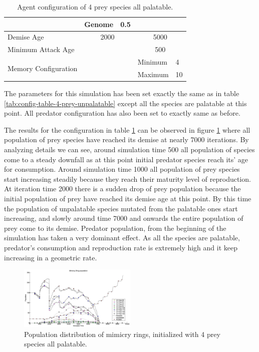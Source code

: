 \documentclass[letterpaper]{article}
\numberwithin{equation}{section}
\begin{document}
\begin{table}[h]
\begin{tabular}{| p{2cm} | p{1.5cm} | p{1cm} | p{.5cm} | p{1.5cm} | p{.5cm} |}
  						 									 & Genome    & \multicolumn{2}{c|}{0.5}  & \multicolumn{2}{c|}{} \\ \hline
  Demise Age	 									 & \multicolumn{3}{c|}{2000}							& \multicolumn{2}{c|}{5000} \\ \hline
  Minimum Attack Age						 & \multicolumn{3}{c|}{} 						    & \multicolumn{2}{c|}{500} \\ \hline
  \multirow{2}{*}{\parbox{2cm}{Memory Configuration}} & \multicolumn{3}{c|}{} 					& Minimum & 4 \\ \cline{5-6}
   																			& \multicolumn{3}{c|}{} 					& Maximum & 10 \\ \hline  
\end{tabular}
\caption{Agent configuration of 4 prey species all palatable.}
\label{tab:config-table-4-prey-palatable}
\end{table}

The parameters for this simulation has been set exactly the same as in table \ref{tab:config-table-4-prey-unpalatable} except all the species are palatable at this point. All predator configuration has also been set to exactly same as before.

The results for the configuration in table \ref{tab:config-table-4-prey-palatable} can be observed in figure \ref{fig:plot-4-prey-p} where all population of prey species have reached its demise at nearly 7000 iterations. By analyzing details we can see, around simulation time 500 all population of species come to a steady downfall as at this point initial predator species reach its' age for consumption. Around simulation time 1000 all population of prey species start increasing steadily because they reach their maturity level of reproduction. At iteration time 2000 there is a sudden drop of prey population because the initial population of prey have reached its demise age at this point. By this time the population of unpalatable species mutated from the palatable ones start increasing, and slowly around time 7000 and onwards the entire population of prey come to its demise. Predator population, from the beginning of the simulation has taken a very dominant effect. As all the species are palatable, predator's consumption and reproduction rate is extremely high and it keep increasing in a geometric rate.

\begin{figure}[H]
	\centering
	\includegraphics[width=0.5\textwidth]{../tex/images/simTime10k-4Prey-p}
	\caption[Population distribution of mimicry rings (4 prey species all palatable)]{Population distribution of mimicry rings, initialized with 4 prey species all palatable.}
	\label{fig:plot-4-prey-p}
\end{figure}
\end{document}
